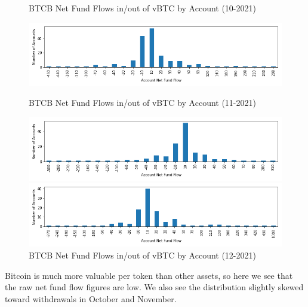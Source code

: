 \documentclass[12pt]{article}
\begin{document}
            \begin{figure}[h]
                \caption{BTCB Net Fund Flows in/out of vBTC by Account (10-2021) \label{overflow}}
                \centering
                \hspace*{-1in}
                \includegraphics[width=0.8\paperwidth]{net-fundflow-accountdist-vBTC-10-2021.png}

                \caption{BTCB Net Fund Flows in/out of vBTC by Account (11-2021) \label{overflow}}
                \centering
                \hspace*{-1in}
                \includegraphics[width=0.8\paperwidth]{net-fundflow-accountdist-vBTC-11-2021.png}

                \caption{BTCB Net Fund Flows in/out of vBTC by Account (12-2021) \label{overflow}}
                \centering
                \hspace*{-1in}
                \includegraphics[width=0.8\paperwidth]{net-fundflow-accountdist-vBTC-12-2021.png}
            \end{figure}

            Bitcoin is much more valuable per token than other assets, so here we see that the raw net fund flow figures are low. We also see the distribution slightly skewed toward withdrawals in October and November.
            \clearpage
\end{document}
